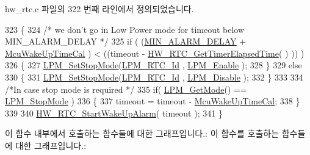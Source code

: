 hw\+\_\+rtc.\+c 파일의 322 번째 라인에서 정의되었습니다.


\begin{DoxyCode}
323 \{
324   \textcolor{comment}{/* we don't go in Low Power mode for timeout below MIN\_ALARM\_DELAY */}
325   \textcolor{keywordflow}{if} ( (\mbox{\hyperlink{hw__rtc_8c_a9d5b1559769779b90b2a3de5757e0038}{MIN\_ALARM\_DELAY}} + \mbox{\hyperlink{hw__rtc_8c_a0d22e01d28d80ec5b4630686aec08e81}{McuWakeUpTimeCal}} ) < ((timeout - 
      \mbox{\hyperlink{group___lory_s_d_k___r_t_c___functions_ga7961116aa831950b62a413ecbbcfb02a}{HW\_RTC\_GetTimerElapsedTime}}( ) )) )
326   \{
327     \mbox{\hyperlink{low__power__manager_8c_ac8a0ff787d7d417b9e1f0697a1d5fd6d}{LPM\_SetStopMode}}(\mbox{\hyperlink{utilities__conf_8h_acfda396432d3ff49786067a2271b5946aa8deb6dd6bf7825a5cd8fb7f727dc860}{LPM\_RTC\_Id}} , \mbox{\hyperlink{low__power__manager_8h_a271e41b451de2369d381b2976f39de57a6fdf7ef1f943192b3507c74647d6d46c}{LPM\_Enable}} );
328   \}
329   \textcolor{keywordflow}{else}
330   \{
331     \mbox{\hyperlink{low__power__manager_8c_ac8a0ff787d7d417b9e1f0697a1d5fd6d}{LPM\_SetStopMode}}(\mbox{\hyperlink{utilities__conf_8h_acfda396432d3ff49786067a2271b5946aa8deb6dd6bf7825a5cd8fb7f727dc860}{LPM\_RTC\_Id}} , \mbox{\hyperlink{low__power__manager_8h_a271e41b451de2369d381b2976f39de57aa998d97d7b8eb3b6234e5b69fce1f375}{LPM\_Disable}} );
332   \}
333 
334   \textcolor{comment}{/*In case stop mode is required */}
335   \textcolor{keywordflow}{if}( \mbox{\hyperlink{low__power__manager_8c_ae9107e412181f10977b724c346cebd45}{LPM\_GetMode}}() == \mbox{\hyperlink{low__power__manager_8h_acb31a7bf1fa8d421505bf31482304507a6cee594fb7226567d00054894c0b4c39}{LPM\_StopMode}} )
336   \{
337     timeout = timeout -  \mbox{\hyperlink{hw__rtc_8c_a0d22e01d28d80ec5b4630686aec08e81}{McuWakeUpTimeCal}};
338   \}
339 
340   \mbox{\hyperlink{group___lory_s_d_k___r_t_c___functions_ga60703fcfc4abd73a2efc980e8bb6ad27}{HW\_RTC\_StartWakeUpAlarm}}( timeout );
341 \}
\end{DoxyCode}
이 함수 내부에서 호출하는 함수들에 대한 그래프입니다.\+:
이 함수를 호출하는 함수들에 대한 그래프입니다.\+:
\mbox{\label{group___lory_s_d_k___r_t_c___functions_ga38285b86b2811230b0a55416ce3c33c7}} 
